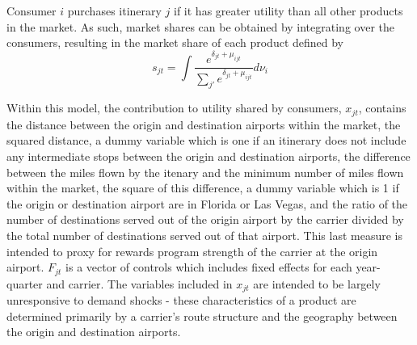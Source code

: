 \documentclass{article}
\begin{document}
	Consumer $i$ purchases itinerary $j$ if it has greater utility than all other products in the market. As such, market shares can be obtained by integrating over the consumers, resulting in the market share of each product defined by \[s_{jt} = \int \frac{e^{\delta_{jt} + \mu_{ijt}}}{\sum_{j'} e^{\delta_{jt} + \mu_{ijt}}} d{\nu_{i}}\]
	
	Within this model, the contribution to utility shared by consumers, $x_{jt}$, contains the distance between the origin and destination airports within the market, the squared distance, a dummy variable which is one if an itinerary does not include any intermediate stops between the origin and destination airports, the difference between the miles flown by the itenary and the minimum number of miles flown within the market, the square of this difference, a dummy variable which is 1 if the origin or destination airport are in Florida or Las Vegas, and the ratio of the number of destinations served out of the origin airport by the carrier divided by the total number of destinations served out of that airport. This last measure is intended to proxy for rewards program strength of the carrier at the origin airport. $F_{jt}$ is a vector of controls which includes fixed effects for each year-quarter and carrier. The variables included in $x_{jt}$ are intended to be largely unresponsive to demand shocks - these characteristics of a product are determined primarily by a carrier's route structure and the geography between the origin and destination airports. 
	
\end{document}
